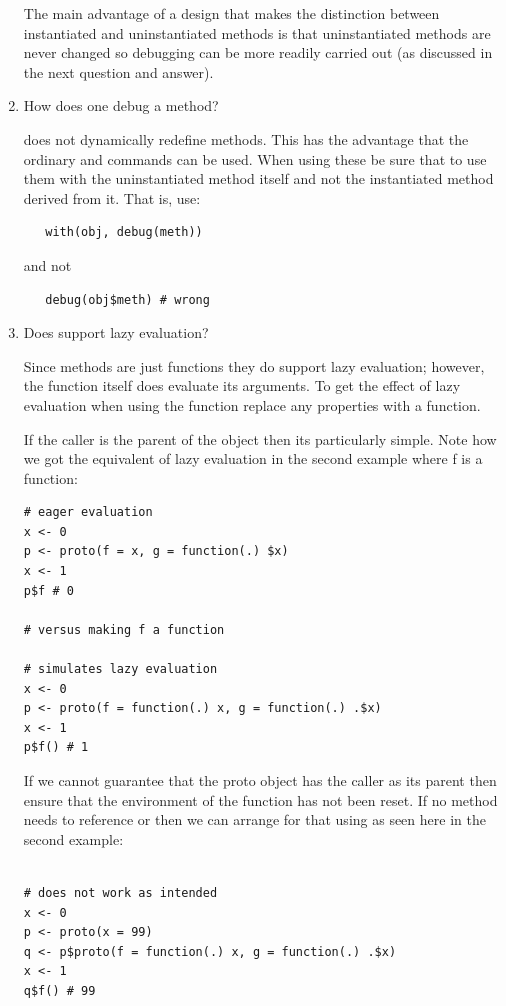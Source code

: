 \documentclass{Z}
\begin{document}
\begin{appendix}
\begin{enumerate}
{The main advantage of a design that makes the distinction between instantiated 
and uninstantiated methods is that uninstantiated methods are never
changed so
debugging can be more readily carried out (as discussed in the next
question and answer).
}
\item{How does one debug a method?

 does not dynamically redefine methods.  This has the advantage
that the ordinary   and  commands can be 
used.  When using these be sure that to use them with the uninstantiated method
itself and not the instantiated method derived from it.  That is,
use:
\begin{verbatim}
   with(obj, debug(meth))
\end{verbatim}

and not 
\begin{verbatim}
   debug(obj$meth) # wrong
\end{verbatim}
}
\item{Does  support lazy evaluation?

Since  methods are just  functions they do support
lazy evaluation; however, the  function itself
does evaluate its arguments.  To get the
effect of lazy evaluation when using the 
function replace any properties with a function.

If the caller is the parent of the  object then its
particularly simple.  Note how we got the equivalent of lazy evaluation
in the second example where f is a function:

\begin{verbatim}
# eager evaluation
x <- 0
p <- proto(f = x, g = function(.) $x)
x <- 1
p$f # 0

# versus making f a function

# simulates lazy evaluation
x <- 0
p <- proto(f = function(.) x, g = function(.) .$x)
x <- 1
p$f() # 1
\end{verbatim}

If we cannot guarantee that the proto object has the caller
as its parent then ensure that the environment of the function
has not been reset.  If no method needs to reference 
or  then we can arrange for that using 
 as seen here in the second example:
\begin{verbatim}

# does not work as intended
x <- 0
p <- proto(x = 99)
q <- p$proto(f = function(.) x, g = function(.) .$x)
x <- 1
q$f() # 99


\end{verbatim}}
\end{enumerate}
\end{appendix}
\end{document}
